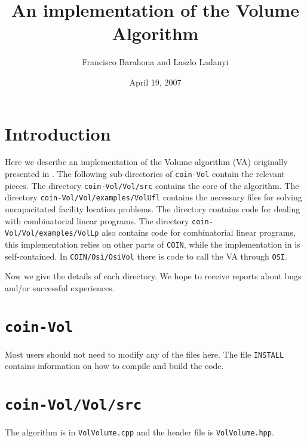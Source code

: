 \documentclass{article}
\begin{document}


\title{\bf An implementation of the Volume Algorithm}
\author{Francisco Barahona and Laszlo Ladanyi}
\date{April 19, 2007}
\maketitle

\section{Introduction}

Here we describe an implementation of the Volume algorithm (VA) originally
presented in \cite{BA1}. The following sub-directories of
{\tt coin-Vol} contain the relevant pieces. The directory {\tt coin-Vol/Vol/src}
contains the core of the algorithm. The directory {\tt coin-Vol/Vol/examples/VolUfl}
contains the necessary files for solving uncapacitated facility location
problems. The directory  contains code for
dealing with combinatorial linear programs. The directory 
{\tt coin-Vol/Vol/examples/VolLp} also contains code for combinatorial linear
programs, this implementation relies on other parts of {\tt COIN}, while
the implementation in  is self-contained. 
In {\tt COIN/Osi/OsiVol} there is code to call the VA through {\tt OSI}.

Now we give the details of each directory. We hope to receive reports about bugs and/or
successful experiences. 


\section{{\tt coin-Vol}}
Most users should not need
to modify any of the files here. The file {\tt INSTALL} contains information on how
to compile and build the code.

\section{{\tt coin-Vol/Vol/src}}
The algorithm is in {\tt VolVolume.cpp} and the header file is 
{\tt VolVolume.hpp}.
\end{document}
